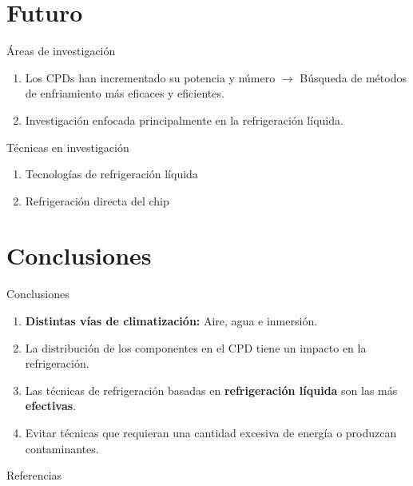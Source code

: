 \documentclass[aspectratio=169, compress]{beamer}
\begin{document}
\section{Futuro}

\begin{frame}{Áreas de investigación}
    \begin{enumerate}
        \item Los CPDs han incrementado su potencia y número $\rightarrow$ Búsqueda de métodos de enfriamiento más eficaces y eficientes.
        \item Investigación enfocada principalmente en la refrigeración líquida.
    \end{enumerate}
\end{frame}

\begin{frame}{Técnicas en investigación}
    \begin{enumerate}
        \item Tecnologías de refrigeración líquida
        \item Refrigeración directa del chip
    \end{enumerate}
\end{frame}




\section{Conclusiones}

\begin{frame}{Conclusiones}
    \begin{enumerate}
        \item \textbf{Distintas vías de climatización:} Aire, agua e inmersión.
        \item La distribución de los componentes en el CPD tiene un impacto en la refrigeración. 
        \item Las técnicas de refrigeración basadas en \textbf{refrigeración líquida} son las más \textbf{efectivas}.
        \item Evitar técnicas que requieran una cantidad excesiva de energía o produzcan contaminantes.
    \end{enumerate}
\end{frame}

\begin{frame}{Referencias}
    
    
\end{frame}
\end{document}
